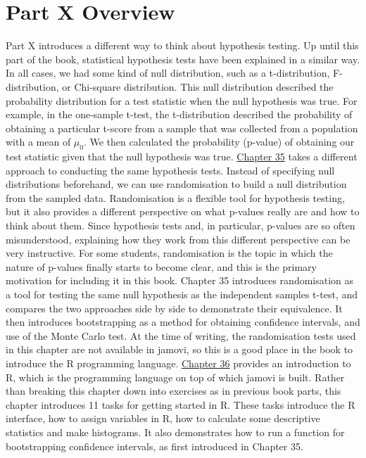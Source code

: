 \documentclass[
]{scrbook}
\begin{document}
\hypertarget{Week11}{%
\chapter*{Part X Overview}\label{Week11}}

Part X introduces a different way to think about hypothesis testing.
Up until this part of the book, statistical hypothesis tests have been explained in a similar way.
In all cases, we had some kind of null distribution, such as a t-distribution, F-distribution, or Chi-square distribution.
This null distribution described the probability distribution for a test statistic when the null hypothesis was true.
For example, in the one-sample t-test, the t-distribution described the probability of obtaining a particular t-score from a sample that was collected from a population with a mean of \(\mu_{0}\).
We then calculated the probability (p-value) of obtaining our test statistic given that the null hypothesis was true.
\protect\hyperlink{Chapter_35}{Chapter 35} takes a different approach to conducting the same hypothesis tests.
Instead of specifying null distributions beforehand, we can use randomisation to build a null distribution from the sampled data.
Randomisation is a flexible tool for hypothesis testing, but it also provides a different perspective on what p-values really are and how to think about them.
Since hypothesis tests and, in particular, p-values are so often misunderstood, explaining how they work from this different perspective can be very instructive.
For some students, randomisation is the topic in which the nature of p-values finally starts to become clear, and this is the primary motivation for including it in this book.
Chapter 35 introduces randomisation as a tool for testing the same null hypothesis as the independent samples t-test, and compares the two approaches side by side to demonstrate their equivalence.
It then introduces bootstrapping as a method for obtaining confidence intervals, and use of the Monte Carlo test.
At the time of writing, the randomisation tests used in this chapter are not available in jamovi, so this is a good place in the book to introduce the R programming language.
\protect\hyperlink{Chapter_36}{Chapter 36} provides an introduction to R, which is the programming language on top of which jamovi is built.
Rather than breaking this chapter down into exercises as in previous book parts, this chapter introduces 11 tasks for getting started in R.
These tasks introduce the R interface, how to assign variables in R, how to calculate some descriptive statistics and make histograms.
It also demonstrates how to run a function for bootstrapping confidence intervals, as first introduced in Chapter 35.
\end{document}
